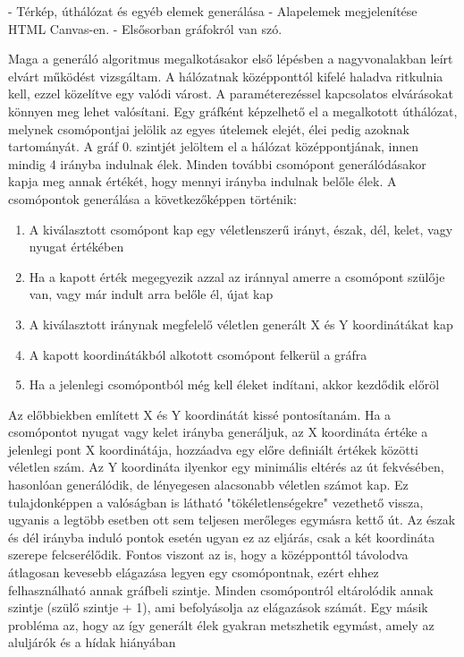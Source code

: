 ﻿

- Térkép, úthálózat és egyéb elemek generálása
- Alapelemek megjelenítése HTML Canvas-en.
- Elsősorban gráfokról van szó.

Maga a generáló algoritmus megalkotásakor első lépésben a nagyvonalakban leírt elvárt működést vizsgáltam. A hálózatnak középponttól kifelé haladva ritkulnia kell, ezzel közelítve egy 
valódi várost. A paraméterezéssel kapcsolatos elvárásokat könnyen meg lehet valósítani. Egy gráfként képzelhető el a megalkotott úthálózat, melynek csomópontjai jelölik az egyes útelemek 
elejét, élei pedig azoknak tartományát. A gráf 0. szintjét jelöltem el a hálózat középpontjának, innen mindig 4 irányba indulnak élek. Minden további csomópont generálódásakor kapja meg 
annak értékét, hogy mennyi irányba indulnak belőle élek. A csomópontok generálása a következőképpen történik:
\begin{enumerate}
\item A kiválasztott csomópont kap egy véletlenszerű irányt, észak, dél, kelet, vagy nyugat értékében
\item Ha a kapott érték megegyezik azzal az iránnyal amerre a csomópont szülője van, vagy már indult arra belőle él, újat kap
\item A kiválasztott iránynak megfelelő véletlen generált X és Y koordinátákat kap
\item A kapott koordinátákból alkotott csomópont felkerül a gráfra
\item Ha a jelenlegi csomópontból még kell éleket indítani, akkor kezdődik előröl
\end{enumerate}
Az előbbiekben említett X és Y koordinátát kissé pontosítanám. Ha a csomópontot nyugat vagy kelet irányba generáljuk, az X koordináta értéke a jelenlegi pont X koordinátája, hozzáadva egy
előre definiált értékek közötti véletlen szám. Az Y koordináta ilyenkor egy minimális eltérés az út fekvésében, hasonlóan generálódik, de lényegesen alacsonabb véletlen számot kap. Ez
tulajdonképpen a valóságban is látható "tökéletlenségekre" vezethető vissza, ugyanis a legtöbb esetben ott sem teljesen merőleges egymásra kettő út. Az észak és dél irányba induló pontok 
esetén ugyan ez az eljárás, csak a két koordináta szerepe felcserélődik.
Fontos viszont az is, hogy a középponttól távolodva átlagosan kevesebb elágazása legyen egy csomópontnak, ezért ehhez felhasználható annak gráfbeli szintje. Minden csomópontról eltárolódik 
annak szintje (szülő szintje + 1), ami befolyásolja az elágazások számát. Egy másik probléma az, hogy az így generált élek gyakran metszhetik egymást, amely az aluljárók és a hídak hiányában 
